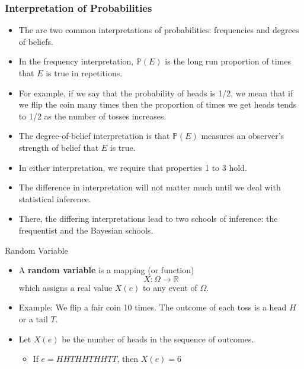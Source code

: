 \documentclass[handout]{beamer}
\begin{document}
\begin{frame}\frametitle{Interpretation of Probabilities}
\begin{scriptsize}
\begin{itemize}
\item The are two common interpretations of probabilities: frequencies and degrees of beliefs. 
\item In the frequency interpretation, $\mathbb{P}(E)$ is the long run proportion of times that $E$ is true in repetitions. 
\item For example, if we say that the probability of heads is 1/2, we mean that if we flip the coin many times then the proportion of times we get heads tends to 1/2 as the number of tosses increases. 
\item The degree-of-belief interpretation is that $\mathbb{P}(E)$ measures an observer's strength of belief that $E$ is true.
\item In either interpretation, we require that properties 1 to 3 hold. 
\item The difference in interpretation will not matter much until we deal with statistical inference. 
\item There, the differing interpretations lead to two schools of inference: the frequentist and the Bayesian schools.
\end{itemize}


\end{scriptsize} 

\end{frame}


\begin{frame}{Random Variable}
\scriptsize{

\begin{itemize}
 \item A \textbf{random variable} is a mapping (or function)
\begin{displaymath}
 X: \Omega \rightarrow \mathbb{R}
\end{displaymath}
which assigns a real value $X(e)$ to any event of $\Omega$.


\item Example: We flip a fair coin 10 times. The outcome of each toss is a head $H$ or a tail $T$.

\item  Let $X(e)$ be the number of heads in the sequence of outcomes.
\begin{itemize}
 \item If $e=HHTHHTHHTT$, then $X(e)=6$ 
\end{itemize}


\end{itemize}

}

\end{frame}
\end{document}
